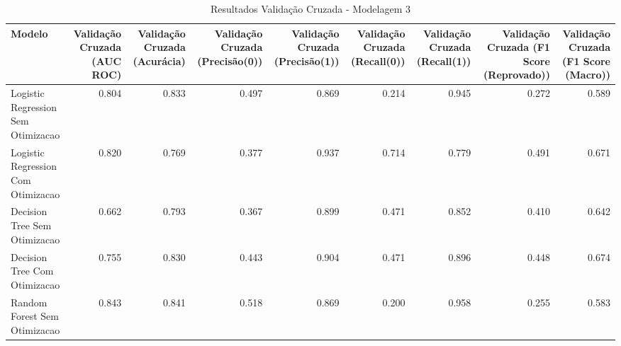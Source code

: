 \begin{table}[H] %
    \centering
    \caption{Resultados Validação Cruzada - Modelagem 3}
    \label{tab:resultados_cv_modelagem_3}
    \renewcommand{\arraystretch}{1.25} %
    \begin{adjustwidth}{ -1in }{ -1in } %
    \centering %
    \small %
    \begin{tabular}{lrrrrrrrr}
\toprule
                            Modelo &  Validação Cruzada (AUC ROC) &  Validação Cruzada (Acurácia) &  Validação Cruzada (Precisão(0)) &  Validação Cruzada (Precisão(1)) &  Validação Cruzada (Recall(0)) &  Validação Cruzada (Recall(1)) &  Validação Cruzada (F1 Score (Reprovado)) &  Validação Cruzada (F1 Score (Macro)) \\
\midrule
Logistic Regression Sem Otimizacao &                        0.804 &                         0.833 &                            0.497 &                            0.869 &                          0.214 &                          0.945 &                                     0.272 &                                 0.589 \\
Logistic Regression Com Otimizacao &                        0.820 &                         0.769 &                            0.377 &                            0.937 &                          0.714 &                          0.779 &                                     0.491 &                                 0.671 \\
      Decision Tree Sem Otimizacao &                        0.662 &                         0.793 &                            0.367 &                            0.899 &                          0.471 &                          0.852 &                                     0.410 &                                 0.642 \\
      Decision Tree Com Otimizacao &                        0.755 &                         0.830 &                            0.443 &                            0.904 &                          0.471 &                          0.896 &                                     0.448 &                                 0.674 \\
      Random Forest Sem Otimizacao &                        0.843 &                         0.841 &                            0.518 &                            0.869 &                          0.200 &                          0.958 &                                     0.255 &                                 0.583 \\

\end{tabular}
\end{adjustwidth}
\end{table}
